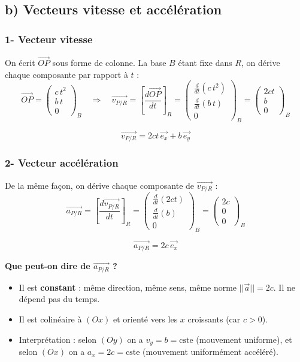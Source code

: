\documentclass[11pt,a4paper]{article}
\begin{document}
\subsection*{b) Vecteurs vitesse et accélération}

\subsubsection*{1- Vecteur vitesse}
On écrit $\vec{OP}$ sous forme de colonne. La base $B$ étant fixe dans $R$, on dérive chaque composante par rapport à $t$ :
$$ \vec{OP} = \begin{pmatrix} c\,t^2 \\ b\,t \\ 0 \end{pmatrix}_B \quad\Longrightarrow\quad \vec{v_{P/R}} = \left[\frac{d\vec{OP}}{dt}\right]_R = \begin{pmatrix} \frac{d}{dt}(c\,t^2) \\[2pt] \frac{d}{dt}(b\,t) \\[2pt] 0 \end{pmatrix}_B = \begin{pmatrix} 2ct \\ b \\ 0 \end{pmatrix}_B $$
\begin{sonucbox}
$$ \vec{v_{P/R}} = 2ct\,\vec{e_x} + b\,\vec{e_y} $$
\end{sonucbox}

\subsubsection*{2- Vecteur accélération}
De la même façon, on dérive chaque composante de $\vec{v_{P/R}}$ :
$$ \vec{a_{P/R}} = \left[\frac{d\vec{v_{P/R}}}{dt}\right]_R = \begin{pmatrix} \frac{d}{dt}(2ct) \\[2pt] \frac{d}{dt}(b) \\[2pt] 0 \end{pmatrix}_B = \begin{pmatrix} 2c \\ 0 \\ 0 \end{pmatrix}_B $$
\begin{sonucbox}
$$ \vec{a_{P/R}} = 2c\,\vec{e_x} $$
\end{sonucbox}
\textbf{Que peut-on dire de $\vec{a_{P/R}}$ ?}
\begin{itemize}
    \item Il est \textbf{constant} : même direction, même sens, même norme $||\vec{a}|| = 2c$. Il ne dépend pas du temps.
    \item Il est colinéaire à $(Ox)$ et orienté vers les $x$ croissants (car $c>0$).
    \item Interprétation : selon $(Oy)$ on a $v_y=b=\text{cste}$ (mouvement uniforme), et selon $(Ox)$ on a $a_x=2c=\text{cste}$ (mouvement uniformément accéléré).
\end{itemize}
\end{document}
